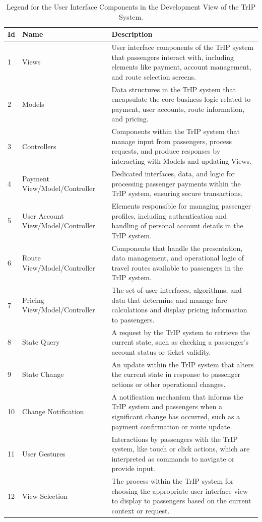 \begin{table}[H]
    \centering
    \caption{Legend for the User Interface Components in the Development View of the TrIP System.}
    \label{tab:trip_system_ui_development_legend}
    \begin{tabular}{@{}llp{10cm}@{}}
    \toprule
    \textbf{Id} & \textbf{Name} & \textbf{Description} \\
    \midrule
    1 & Views & User interface components of the TrIP system that passengers interact with, including elements like payment, account management, and route selection screens. \\
    2 & Models & Data structures in the TrIP system that encapsulate the core business logic related to payment, user accounts, route information, and pricing. \\
    3 & Controllers & Components within the TrIP system that manage input from passengers, process requests, and produce responses by interacting with Models and updating Views. \\
    4 & Payment View/Model/Controller & Dedicated interfaces, data, and logic for processing passenger payments within the TrIP system, ensuring secure transactions. \\
    5 & User Account View/Model/Controller & Elements responsible for managing passenger profiles, including authentication and handling of personal account details in the TrIP system. \\
    6 & Route View/Model/Controller & Components that handle the presentation, data management, and operational logic of travel routes available to passengers in the TrIP system. \\
    7 & Pricing View/Model/Controller & The set of user interfaces, algorithms, and data that determine and manage fare calculations and display pricing information to passengers. \\
    8 & State Query & A request by the TrIP system to retrieve the current state, such as checking a passenger's account status or ticket validity. \\
    9 & State Change & An update within the TrIP system that alters the current state in response to passenger actions or other operational changes. \\
    10 & Change Notification & A notification mechanism that informs the TrIP system and passengers when a significant change has occurred, such as a payment confirmation or route update. \\
    11 & User Gestures & Interactions by passengers with the TrIP system, like touch or click actions, which are interpreted as commands to navigate or provide input. \\
    12 & View Selection & The process within the TrIP system for choosing the appropriate user interface view to display to passengers based on the current context or request. \\
    \bottomrule
    \end{tabular}
\end{table}

